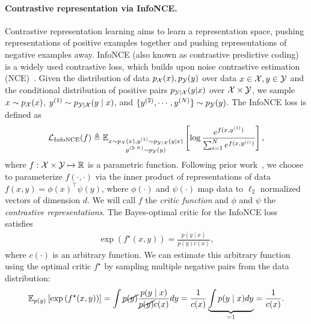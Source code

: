 \documentclass{article} %
\begin{document}
\paragraph{Contrastive representation via InfoNCE.}
Contrastive representation learning aims to learn a representation space, pushing representations of positive examples together and pushing representations of negative examples away. InfoNCE (also known as contrastive predictive coding)~\citep{sohn2016improved, jozefowicz2016exploring, oord2018representation, henaff2020data} is a widely used contrastive loss, which builds upon noise contrastive estimation (NCE)~\citep{gutmann2010noise, ma2018noise}. 
Given the distribution of data $p_{{\mathcal{X}}}(x), p_{{\mathcal{Y}}}(y)$ over data $x \in {\mathcal{X}}, y \in {\mathcal{Y}}$ and the conditional distribution of positive pairs $p_{{\mathcal{Y}} \mid {\mathcal{X}}}(y | x)$ over ${\mathcal{X}} \times {\mathcal{Y}}$, we sample $x \sim p_{{\mathcal{X}}}(x)$, $y^{(1)} \sim p_{{\mathcal{Y}} \mid {\mathcal{X}}}(y \mid x)$, and $\{y^{(2)}, \cdots, y^{(N)}\} \sim p_{{\mathcal{Y}}}(y)$. The InfoNCE loss is defined as
\begin{align}
    \mathcal{L}_{\text{InfoNCE}}(f) \triangleq  \mathbb{E}_{\substack{x \sim p_{{\mathcal{X}}}(x), y^{(1)} \sim p_{{\mathcal{Y}} \mid {\mathcal{X}}}(y \mid x) \\ y^{(2:N)} \sim p_{{\mathcal{Y}}}(y)}} \left[ \log \frac{e^{f(x, y^{(1)})}}{ \sum_{i = 1}^N e^{f(x, y^{(i)})} } \right],
    \label{eq:infonce}
\end{align}
where $f: {\mathcal{X}} \times {\mathcal{Y}} \mapsto \mathbb{R}$ is a parametric function. Following prior work~\citep{eysenbach2022contrastive, wang2020understanding, touati2021learning}, we choose to parameterize $f(\cdot, \cdot)$ via the inner product of representations of data $f(x, y) = \phi(x)^{\top} \psi(y)$, where $\phi(\cdot)$ and $\psi(\cdot)$ map data to $\ell_2$ normalized vectors of dimension $d$. We will call $f$ the \emph{critic function} and $\phi$ and $\psi$ the \emph{contrastive representations}. The Bayes-optimal critic for the InfoNCE loss satisfies~\citep{poole2019variational, ma2018noise, oord2018representation}
\begin{align*}
    \exp \left(f^{\star}(x, y) \right) = \frac{p(y \mid x)}{p(y) c(x)},
\end{align*}
where $c(\cdot)$ is an arbitrary function. We can estimate this arbitrary function using the optimal critic $f^{\star}$ by sampling multiple negative pairs from the data distribution:
\begin{align}
    \mathbb{E}_{p(y)}\left[\exp \left( f^{\star}(x, y) \right) \right] = \int \cancel{p(y)} \frac{p(y \mid x)}{\cancel{p(y)}c(x)} dy = \frac{1}{c(x)} \underbrace{\int p(y \mid x) dy}_{ = 1} = \frac{1}{c(x)}.
    \label{eq:arbitrary-func-est}
\end{align}
\end{document}
